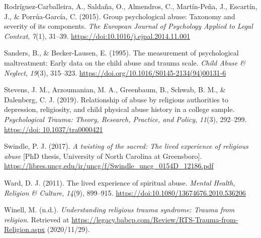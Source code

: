 \documentclass[
  letterpaper,
]{article}
\newlength{\cslhangindent}
\newenvironment{CSLReferences}[2] %
 {\begin{list}{}{%
  \setlength{\itemindent}{0pt}
  \setlength{\leftmargin}{0pt}
  \setlength{\parsep}{0pt}
  \ifodd #1
   \setlength{\leftmargin}{\cslhangindent}
   \setlength{\itemindent}{-1\cslhangindent}
  \fi
  \setlength{\itemsep}{#2\baselineskip}}}
 {\end{list}}
\begin{document}
\begin{CSLReferences}{1}{0}
Rodríguez-Carballeira, A., Saldaña, O., Almendros, C., Martín-Peña, J.,
Escartín, J., \& Porrúa-García, C. (2015). Group psychological abuse:
Taxonomy and severity of its components. \emph{The European Journal of
Psychology Applied to Legal Context}, \emph{7}(1), 31--39.
\url{https://doi:10.1016/j.ejpal.2014.11.001}

Sanders, B., \& Becker-Lausen, E. (1995). The measurement of
psychological maltreatment: Early data on the child abuse and trauma
scale. \emph{Child Abuse \& Neglect}, \emph{19}(3), 315--323.
\url{https://doi.org/10.1016/S0145-2134(94)00131-6}

Stevens, J. M., Arzoumanian, M. A., Greenbaum, B., Schwab, B. M., \&
Dalenberg, C. J. (2019). Relationship of abuse by religious authorities
to depression, religiosity, and child physical abuse history in a
college sample. \emph{Psychological Trauma: Theory, Research, Practice,
and Policy}, \emph{11}(3), 292--299.
\href{https://doi:\%2010.1037/tra0000421}{https://doi:
10.1037/tra0000421}

Swindle, P. J. (2017). \emph{A twisting of the sacred: The lived
experience of religious abuse} {[}PhD thesis, University of North
Carolina at Greensboro{]}.
\url{https://libres.uncg.edu/ir/uncg/f/Swindle_uncg_0154D_12186.pdf}

Ward, D. J. (2011). The lived experience of spiritual abuse.
\emph{Mental Health, Religion \& Culture}, \emph{14}(9), 899--915.
\url{https://doi:10.1080/13674676.2010.536206}

Winell, M. (n.d.). \emph{Understanding religious trauma syndrome: Trauma
from religion}. Retrieved at
\url{https://legacy.babcp.com/Review/RTS-Trauma-from-Religion.aspx}
(2020/11/29).

\end{CSLReferences}
\end{document}
